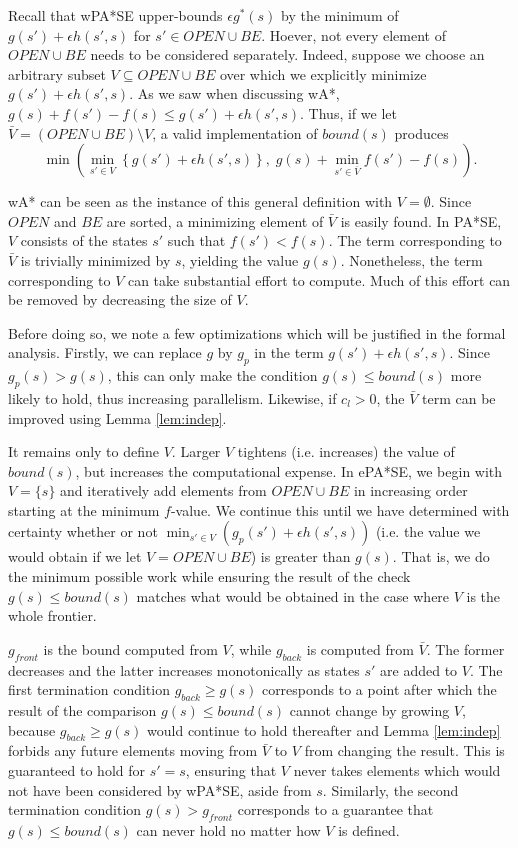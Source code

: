 \documentclass[letterpaper]{article}
\begin{document}
Recall that wPA*SE upper-bounds $\epsilon g^*(s)$ by the minimum of $g(s') + \epsilon h(s',s)$ for $s'\in OPEN\cup BE$. Hoever, not every element of $OPEN\cup BE$ needs to be considered separately. Indeed, suppose we choose an arbitrary subset $V\subseteq OPEN\cup BE$ over which we explicitly minimize $g(s') + \epsilon h(s',s)$. As we saw when discussing wA*, $g(s) + f(s') - f(s) \le g(s') + \epsilon h(s',s)$. Thus, if we let $\bar V = (OPEN\cup BE)\setminus V$, a valid implementation of $bound(s)$ produces 
\[\min\left(\min_{s'\in V}\left\{g(s') + \epsilon h(s',s)\right\},\;g(s) + \min_{s'\in\bar V} f(s') - f(s)  \right).\]

wA* can be seen as the instance of this general definition with $V = \emptyset$. Since $OPEN$ and $BE$ are sorted, a minimizing element of $\bar V$ is easily found. In PA*SE, $V$ consists of the states $s'$ such that $f(s') < f(s)$. The term corresponding to $\bar V$ is trivially minimized by $s$, yielding the value $g(s)$. Nonetheless, the term corresponding to $V$ can take substantial effort to compute. Much of this effort can be removed by decreasing the size of $V$.

Before doing so, we note a few optimizations which will be justified in the formal analysis. Firstly, we can replace $g$ by $g_p$ in the term $g(s') + \epsilon h(s',s)$. Since $g_p(s) > g(s)$, this can only make the condition $g(s) \le bound(s)$ more likely to hold, thus increasing parallelism. Likewise, if $c_l > 0$, the $\bar V$ term can be improved using Lemma \ref{lem:indep}.

It remains only to define $V$. Larger $V$ tightens (i.e. increases) the value of $bound(s)$, but increases the computational expense. In ePA*SE, we begin with $V = \{s\}$ and iteratively add elements from $OPEN\cup BE$ in increasing order starting at the minimum $f$-value. We continue this until we have determined with certainty whether or not $\min_{s'\in V}\left(g_p(s') + \epsilon h(s',s)\right)$ (i.e. the value we would obtain if we let $V = OPEN\cup BE$) is greater than $g(s)$. That is, we do the minimum possible work while ensuring the result of the check $g(s) \le bound(s)$ matches what would be obtained in the case where $V$ is the whole frontier.

$g_{front}$ is the bound computed from $V$, while $g_{back}$ is computed from $\bar V$. The former decreases and the latter increases monotonically as states $s'$ are added to $V$. The first termination condition $g_{back} \ge g(s)$ corresponds to a point after which the result of the comparison $g(s) \le bound(s)$ cannot change by growing $V$, because $g_{back} \ge g(s)$ would continue to hold thereafter and Lemma \ref{lem:indep} forbids any future elements moving from $\bar V$ to $V$ from changing the result. This is guaranteed to hold for $s' = s$, ensuring that $V$ never takes elements which would not have been considered by wPA*SE, aside from $s$. Similarly, the second termination condition $g(s) > g_{front}$ corresponds to a guarantee that $g(s) \le bound(s)$ can never hold no matter how $V$ is defined.
\end{document}
